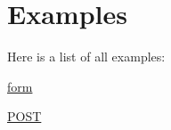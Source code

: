 \section{Examples}
Here is a list of all examples:\begin{DoxyCompactItemize}
\item 
\hyperlink{form-example}{form}
\item 
\hyperlink{POST-example}{POST}
\end{DoxyCompactItemize}

